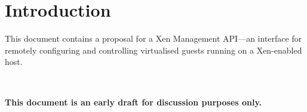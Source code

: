 \documentclass{report}
\begin{document}



\chapter{Introduction}

This document contains a proposal for a Xen Management API---an interface for
remotely configuring and controlling virtualised guests running on a
Xen-enabled host. 

~

{\bf \large This document is an early draft for discussion purposes only.}

~








\end{document}
